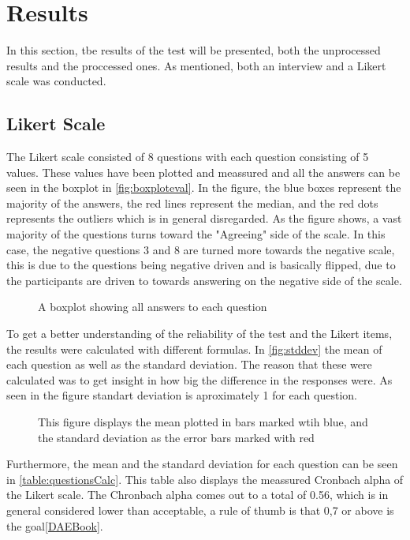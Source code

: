 \section{Results}
In this section, tbe results of the test will be presented, both the unprocessed results and the proccessed ones. As mentioned, both an interview and a Likert scale was conducted. 

\subsection{Likert Scale}
The Likert scale consisted of 8 questions with each question consisting of 5 values. These values have been plotted and meassured and all the answers can be seen in the boxplot in \autoref{fig:boxploteval}. In the figure, the blue boxes represent the majority of the answers, the red lines represent the median, and the red dots represents the outliers which is in general disregarded. As the figure shows, a vast majority of the questions turns toward the "Agreeing" side of the scale. In this case, the negative questions 3 and 8 are turned more towards the negative scale, this is due to the questions being negative driven and is basically flipped, due to the participants are driven to towards answering on the negative side of the scale. 

\begin{figure}[H]
	
	\centering
	\caption{A boxplot showing all answers to each question}
	\label{fig:boxploteval}
\end{figure}

To get a better understanding of the reliability of the test and the Likert items, the results were calculated with different formulas. In \autoref{fig:stddev} the mean of each question as well as the standard deviation. The reason that these were calculated was to get insight in how big the difference in the responses were. As seen in the figure standart deviation
is aproximately 1 for each question.
\begin{figure}[H]
	
	\centering
	\caption{This figure displays the mean plotted in bars marked wtih blue, and the standard deviation as the error bars marked with red}
	\label{fig:stddev}
\end{figure}

Furthermore, the mean and the standard deviation for each question can be seen in \autoref{table:questionsCalc}. This table also displays the meassured Cronbach alpha of the Likert scale. The Chronbach alpha comes out to a total of 0.56, which is in general considered lower than acceptable, a rule of thumb is that 0,7 or above is the goal\autoref{DAEBook}.

